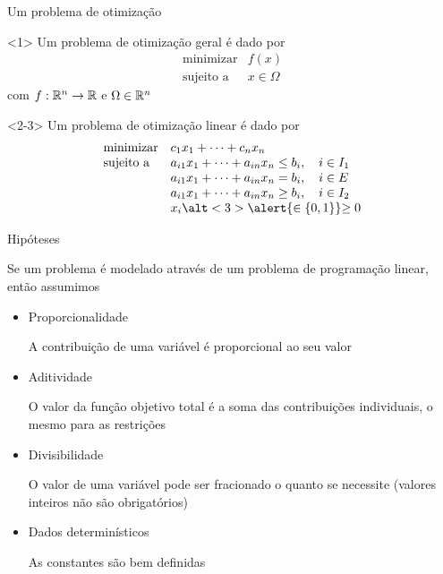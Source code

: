 \documentclass[10pt]{beamer}
\begin{document}
\begin{frame}{Um problema de otimização}

  \begin{onlyenv}<1>
    Um problema de otimização geral é dado por
    \[
      \begin{array}{ll}
        \mbox{minimizar} & f(x) \\
        \mbox{sujeito a} & x \in \Omega
      \end{array}
    \]
    com $f: \mathbb{R}^n \to \mathbb{R}$ e $\Omega \in \mathbb{R}^n$
  \end{onlyenv}
  
  \begin{onlyenv}<2-3>
    Um problema de otimização linear é dado por
    \[
      \begin{array}{ll}
        \mbox{minimizar} & c_1 x_1 + \dots + c_n x_n \\
        \mbox{sujeito a} & a_{i1} x_1 + \dots + a_{in} x_n \le b_i, \quad i \in I_1 \\
        & a_{i1} x_1 + \dots + a_{in} x_n = b_i, \quad i \in E \\
        & a_{i1} x_1 + \dots + a_{in} x_n \ge b_i, \quad i \in I_2 \\
        & x_i \alt<3>{\alert{\in \{0, 1\}}}{\ge 0}
      \end{array}
    \]
  \end{onlyenv}

\end{frame}

\begin{frame}{Hipóteses}

  Se um problema é modelado através de um problema de programação
  linear, então assumimos
  
  \begin{itemize}
  \item Proporcionalidade

    A contribuição de uma variável é proporcional ao seu valor
    
  \item Aditividade

    O valor da função objetivo total é a soma das contribuições
    individuais, o mesmo para as restrições
    
  \item Divisibilidade

    O valor de uma variável pode ser fracionado o quanto se necessite
    (valores inteiros não são obrigatórios)
    
  \item Dados determinísticos

    As constantes são bem definidas

  \end{itemize}
  
\end{frame}
\end{document}
